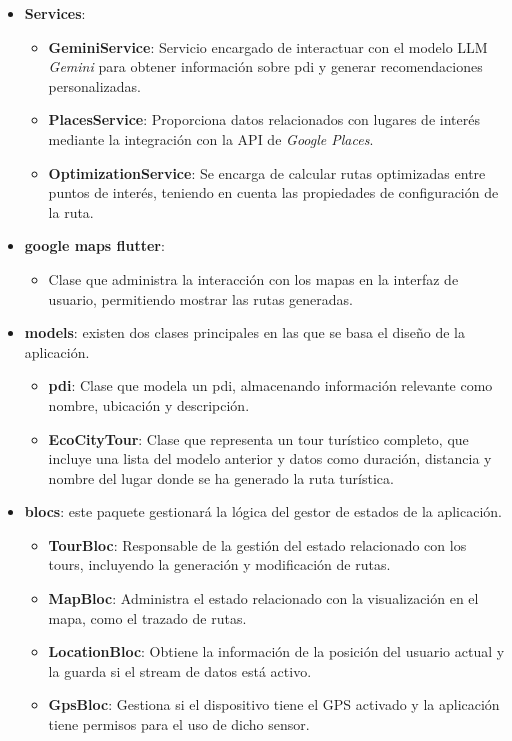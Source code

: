 \begin{itemize}
	\item \textbf{Services}:
	\begin{itemize}
		\item \textbf{GeminiService}: Servicio encargado de interactuar con el modelo LLM \textit{Gemini} para obtener información sobre \acrlong{pdi} y generar recomendaciones personalizadas.
		\item \textbf{PlacesService}: Proporciona datos relacionados con lugares de interés mediante la integración con la API de \textit{Google Places}.
		\item \textbf{OptimizationService}: Se encarga de calcular rutas optimizadas entre puntos de interés, teniendo en cuenta las propiedades de configuración de la ruta.
	\end{itemize}
	
	\item \textbf{google maps flutter}:
	\begin{itemize}
		\item Clase que administra la interacción con los mapas en la interfaz de usuario, permitiendo mostrar las rutas generadas.
	\end{itemize}
	
	\item \textbf{models}: existen dos clases principales en las que se basa el diseño de la aplicación.
	\begin{itemize}
		\item \textbf{\acrlong{pdi}}: Clase que modela un \acrshort{pdi}, almacenando información relevante como nombre, ubicación y descripción. 
		\item \textbf{EcoCityTour}: Clase que representa un tour turístico completo, que incluye una lista del modelo anterior y datos como duración, distancia y nombre del lugar donde se ha generado la ruta turística.
	\end{itemize}
	
	\item \textbf{blocs}: este paquete gestionará la lógica del gestor de estados de la aplicación.
	\begin{itemize}
		\item \textbf{TourBloc}: Responsable de la gestión del estado relacionado con los tours, incluyendo la generación y modificación de rutas.
		\item \textbf{MapBloc}: Administra el estado relacionado con la visualización en el mapa, como el trazado de rutas.
		\item \textbf{LocationBloc}: Obtiene la información de la posición del usuario actual y la guarda si el stream de datos está activo.
		\item \textbf{GpsBloc}: Gestiona si el dispositivo tiene el GPS activado y la aplicación tiene permisos para el uso de dicho sensor.
	\end{itemize}
	

\end{itemize}
